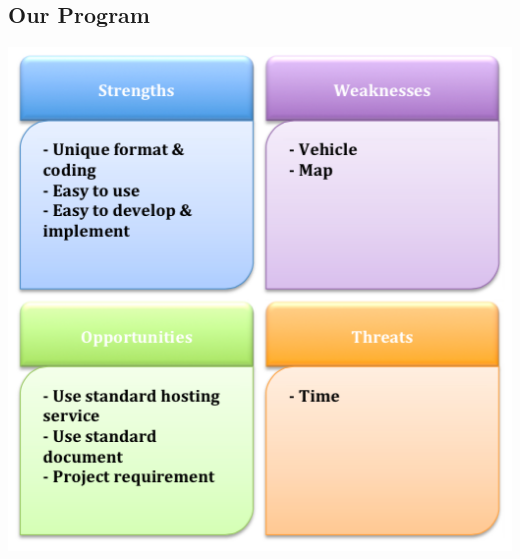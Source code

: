 \documentclass[11pt]{article}
\begin{document}
\subsection{Our Program}
\begin{center}			
	\includegraphics[scale = 0.4]{Figure03}
\end{center}
\end{document}
